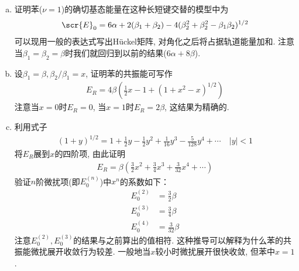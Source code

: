 {\begin{enumerate}[a.]
	\item 证明苯($\nu=1$)的确切基态能量在这种长短键交替的模型中为
	\begin{align*}
	\scr{E}_0 = 6\alpha + 2(\beta_1+\beta_2) - 4(\beta_2^2 + \beta_2^2 -\beta_1\beta_2)^{1/2}
	\end{align*}
	可以现用一般的表达式写出H\"uckel矩阵, 对角化之后将占据轨道能量加和. 注意当$\beta_1=\beta_2=\beta$时我们就回归到以前的结果($6\alpha+8\beta$). 
	\item 设$\beta_1=\beta,\beta_2/\beta_1=x$, 证明苯的共振能可写作
	\begin{align*}
	E_R = 4\beta(\frac{1}{2}x-1+(1+x^2-x)^{1/2})
	\end{align*}
	注意当$x=0$时$E_R=0$, 当$x=1$时$E_R=2\beta$, 这结果为精确的.
	\item
	利用式子
	\begin{align*}
	(1+y)^{1/2} = 1 + \frac{1}{2}y -\frac{1}{2}y^2 + \frac{1}{16}y^3 - \frac{5}{128}y^4 + \cdots\quad|y|<1
 	\end{align*}
 	将$E_R$展到$x$的四阶项, 由此证明
 	\begin{align*}
 	E_R = \beta(\frac{3}{2}x^2+\frac{3}{4}x^3 + \frac{3}{32}x^4+\cdots)
 	\end{align*}
 	验证$n$阶微扰项(即$E_0^{(n)}$)中$x^n$的系数如下：
 	\begin{align*}
 	E_0^{(2)} & = \frac{3}{2}\beta\\
 	E_0^{(3)} & = \frac{3}{4}\beta\\
 	E_0^{(4)} & = \frac{3}{32}\beta
 	\end{align*}
 	注意$E_0^{(2)},E_0^{(3)}$的结果与之前算出的值相符. 这种推导可以解释为什么苯的共振能微扰展开收敛行为较差. 一般地当$x$较小时微扰展开很快收敛, 但苯中$x=1$.
 	

\end{enumerate}}
